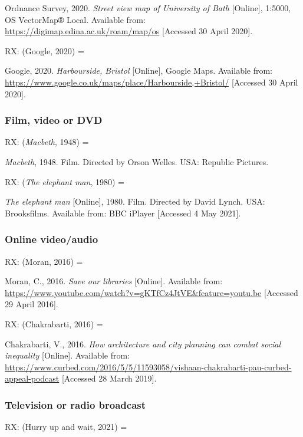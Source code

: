 Ordnance Survey, 2020. \emph{Street view map of University of Bath} [Online], 1:5000, OS VectorMap® Local. Available from: \url{https://digimap.edina.ac.uk/roam/map/os} [Accessed 30 April 2020].


RX: (Google, 2020) = \cite{google2020harbourside}

Google, 2020. \emph{Harbourside, Bristol} [Online], Google Maps. Available from: \url{https://www.google.co.uk/maps/place/Harbourside,+Bristol/} [Accessed 30 April 2020].



\subsubsection*{Film, video or DVD}

RX: (\emph{Macbeth}, 1948) = \cite{macbeth1948}

\emph{Macbeth}, 1948. Film. Directed by Orson Welles. USA: Republic Pictures.


RX: (\emph{The elephant man}, 1980) = \cite{elephant-man1980}

\emph{The elephant man} [Online], 1980. Film. Directed by David Lynch. USA: Brooksfilms. Available from: BBC iPlayer [Accessed 4 May 2021].



\subsubsection*{Online video\slash audio}

RX: (Moran, 2016) = \cite{moran2016sol}

Moran, C., 2016. \emph{Save our libraries} [Online]. Available from: \url{https://www.youtube.com/watch?v=gKTfCz4JtVE&feature=youtu.be} [Accessed 29 April 2016].


RX: (Chakrabarti, 2016) = \cite{chakrabarti2016hac}

Chakrabarti, V., 2016. \emph{How architecture and city planning can combat social inequality} [Online]. Available from: \url{https://www.curbed.com/2016/5/5/11593058/vishaan-chakrabarti-pau-curbed-appeal-podcast} [Accessed 28 March 2019].



\subsubsection*{Television or radio broadcast}

RX: (Hurry up and wait, 2021) = \cite{inn2021huw}

